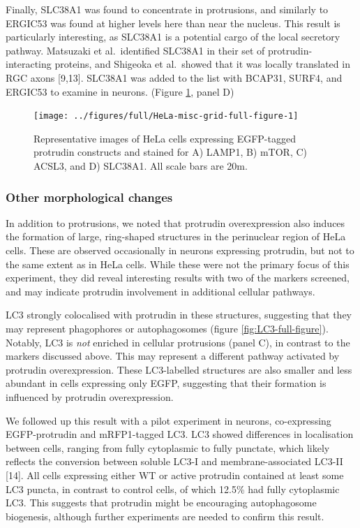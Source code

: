 \documentclass[
  12pt,
  a4paper,
]{book}
\begin{document}
Finally, SLC38A1 was found to concentrate in protrusions, and similarly to ERGIC53 was found at higher levels here than near the nucleus. This result is particularly interesting, as SLC38A1 is a potential cargo of the local secretory pathway. Matsuzaki et al.~identified SLC38A1 in their set of protrudin-interacting proteins, and Shigeoka et al.~showed that it was locally translated in RGC axons {[}9,13{]}. SLC38A1 was added to the list with BCAP31, SURF4, and ERGIC53 to examine in neurons. (Figure \ref{fig:HeLa-misc-grid-full-figure}, panel D)

\begin{figure}
\texttt{[image: ../figures/full/HeLa-misc-grid-full-figure-1]} \caption[Protrudin-expressing HeLa cells stained for LAMP1, mTOR, ACSL3, and SLC38A1]{Representative images of HeLa cells expressing EGFP-tagged protrudin constructs and stained  for A) LAMP1, B) mTOR, C) ACSL3, and D) SLC38A1.  All scale bars are 20\textmu{}m.}\label{fig:HeLa-misc-grid-full-figure}
\end{figure}

\hypertarget{other-morphological-changes}{%
\subsubsection{Other morphological changes}\label{other-morphological-changes}}

In addition to protrusions, we noted that protrudin overexpression also induces the formation of large, ring-shaped structures in the perinuclear region of HeLa cells. These are observed occasionally in neurons expressing protrudin, but not to the same extent as in HeLa cells. While these were not the primary focus of this experiment, they did reveal interesting results with two of the markers screened, and may indicate protrudin involvement in additional cellular pathways.

LC3 strongly colocalised with protrudin in these structures, suggesting that they may represent phagophores or autophagosomes (figure \ref{fig:LC3-full-figure}). Notably, LC3 is \emph{not} enriched in cellular protrusions (panel C), in contrast to the markers discussed above. This may represent a different pathway activated by protrudin overexpression. These LC3-labelled structures are also smaller and less abundant in cells expressing only EGFP, suggesting that their formation is influenced by protrudin overexpression.

We followed up this result with a pilot experiment in neurons, co-expressing EGFP-protrudin and mRFP1-tagged LC3. LC3 showed differences in localisation between cells, ranging from fully cytoplasmic to fully punctate, which likely reflects the conversion between soluble LC3-I and membrane-associated LC3-II {[}14{]}. All cells expressing either WT or active protrudin contained at least some LC3 puncta, in contrast to control cells, of which 12.5\% had fully cytoplasmic LC3. This suggests that protrudin might be encouraging autophagosome biogenesis, although further experiments are needed to confirm this result.
\end{document}
